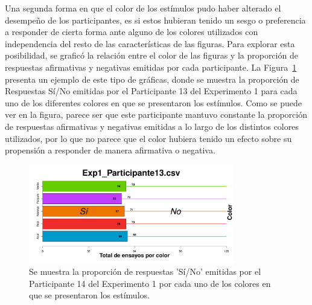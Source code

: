 \begin{itemize}
Una segunda forma en que el color de los estímulos pudo haber alterado el desempeño de los participantes, es si estos hubieran tenido un sesgo o preferencia a responder de cierta forma ante alguno de los colores utilizados con independencia del resto de las características de las figuras. Para explorar esta posibilidad, se graficó la relación entre el color de las figuras y la proporción de respuestas afirmativas y negativas emitidas por cada participante. La Figura~\ref{fig:BiasCol_E1_P13} presenta un ejemplo de este tipo de gráficas, donde se muestra la proporción de Respuestas Sí/No emitidas por el Participante 13 del Experimento 1 para cada uno de los diferentes colores en que se presentaron los estímulos. Como se puede ver en la figura, parece ser que este participante mantuvo constante la proporción de respuestas afirmativas y negativas emitidas a lo largo de los distintos colores utilizados, por lo que no parece que el color hubiera tenido un efecto sobre su propensión a responder de manera afirmativa o negativa.\\

\begin{figure}[th]
\centering
\includegraphics[width=0.80\textwidth]{Figures/BiasColor_Exp1_P13}
\decoRule
\caption[Explorando datos individuales (ejemplo): Proporción de respuestas 'Sí' y 'No' registradas por cada color de figura]{Se muestra la proporción de respuestas 'Sí/No' emitidas por el Participante 14 del Experimento 1 por cada uno de los colores en que se presentaron los estímulos.}
\label{fig:BiasCol_E1_P13}
\end{figure}
\end{itemize}


